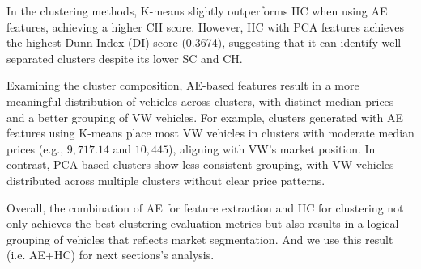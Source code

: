 \documentclass{article} %
\newcommand{\purpletext}[1]{\textcolor{purple!75!black}{#1}}
\begin{document}
In the clustering methods, K-means slightly outperforms HC when using AE features, achieving a higher CH score. However, HC with PCA features achieves the highest Dunn Index (DI) score (0.3674), suggesting that it can identify well-separated clusters despite its lower SC and CH.

Examining the cluster composition, AE-based features result in a more meaningful distribution of vehicles across clusters, with distinct median prices and a better grouping of VW vehicles. For example, clusters generated with AE features using K-means place most VW vehicles in clusters with moderate median prices (e.g., $9,717.14$ and $10,445$), aligning with VW's market position. In contrast, PCA-based clusters show less consistent grouping, with VW vehicles distributed across multiple clusters without clear price patterns.

Overall, the combination of AE for feature extraction and HC for clustering not only achieves the best clustering evaluation metrics but also results in a logical grouping of vehicles that reflects market segmentation. 
And we use this result (i.e. \purpletext{AE+HC}) for next sections's analysis.
\end{document}
